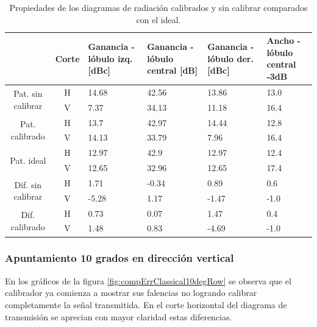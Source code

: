 \begin{table}[H]
  \footnotesize
  \centering
  \begin{tabular}{|c|c|p{2cm}|p{2.5cm}|p{2.5cm}|p{2.5cm}|}
    \cline{2-6}
    \multicolumn{1}{c|}{} & Corte & Ganancia - lóbulo izq. [dBc] & Ganancia - lóbulo central [dB] &
    Ganancia - lóbulo der. [dBc] & Ancho - lóbulo central -3dB \tabularnewline\hline
    \multirow{2}{2cm}{Pat. sin calibrar} & H & 14.68 & 42.56 & 13.86 & 13.0 \tabularnewline\cline{2-6}
     & V & 7.37 & 34.13 & 11.18 & 16.4 \tabularnewline\hline
    \multirow{2}{2cm}{Pat. calibrado} & H & 13.7 & 42.97 & 14.44 & 12.8 \tabularnewline\cline{2-6}
     & V & 14.13 & 33.79 & 7.96 & 16.4 \tabularnewline\hline
    \multirow{2}{2cm}{Pat. ideal} & H & 12.97 & 42.9 & 12.97 & 12.4 \tabularnewline\cline{2-6}
     & V & 12.65 & 32.96 & 12.65 & 17.4 \tabularnewline\hline
    \multirow{2}{2cm}{Dif. sin calibrar} & H & 1.71 & -0.34 & 0.89 & 0.6\tabularnewline\cline{2-6}
     & V & -5.28 & 1.17 & -1.47 & -1.0 \tabularnewline\hline
    \multirow{2}{2cm}{Dif. calibrado} & H & 0.73 & 0.07 & 1.47 & 0.4 \tabularnewline\cline{2-6}
     & V & 1.48 & 0.83 & -4.69 & -1.0 \tabularnewline\hline
  \end{tabular}
  \caption{Propiedades de los diagramas de radiación calibrados y sin calibrar comparados con el ideal.}
  \label{tab:compErrClassical10degCol}
\end{table}


\subsubsection{Apuntamiento 10 grados en dirección vertical}

En los gráficos de la figura \ref{fig:compErrClassical10degRow} se observa que el calibrador ya comienza a mostrar sus falencias no 
logrando calibrar completamente la señal transmitida. En el corte horizontal del diagrama de transmisión se aprecian con mayor 
claridad estas diferencias.

